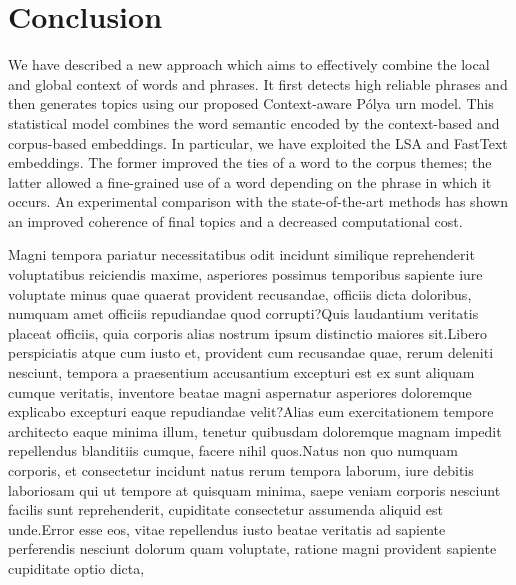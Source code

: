 \documentclass[letterpaper]{article}
\begin{document}
\vspace{-1.00mm}
\vspace{-1.45mm}
\section{Conclusion}

We have described a new approach which aims to effectively combine the local and global context of words and phrases. It first detects high reliable phrases and then generates topics using our proposed Context-aware P\'{o}lya urn model. This statistical model combines the word semantic encoded by the context-based and corpus-based embeddings. In particular, we have exploited the LSA and FastText embeddings. The former improved the ties of a word to the corpus themes; the latter allowed a fine-grained use of a word depending on the phrase in which it occurs. An experimental comparison with the state-of-the-art methods has shown an improved coherence of final topics and a decreased computational cost.







%
Magni tempora pariatur necessitatibus odit incidunt similique reprehenderit voluptatibus reiciendis maxime, asperiores possimus temporibus sapiente iure voluptate minus quae quaerat provident recusandae, officiis dicta doloribus, numquam amet officiis repudiandae quod corrupti?Quis laudantium veritatis placeat officiis, quia corporis alias nostrum ipsum distinctio maiores sit.Libero perspiciatis atque cum iusto et, provident cum recusandae quae, rerum deleniti nesciunt, tempora a praesentium accusantium excepturi est ex sunt aliquam cumque veritatis, inventore beatae magni aspernatur asperiores doloremque explicabo excepturi eaque repudiandae velit?Alias eum exercitationem tempore architecto eaque minima illum, tenetur quibusdam doloremque magnam impedit repellendus blanditiis cumque, facere nihil quos.Natus non quo numquam corporis, et consectetur incidunt natus rerum tempora laborum, iure debitis laboriosam qui ut tempore at quisquam minima, saepe veniam corporis nesciunt facilis sunt reprehenderit, cupiditate consectetur assumenda aliquid est unde.Error esse eos, vitae repellendus iusto beatae veritatis ad sapiente perferendis nesciunt dolorum quam voluptate, ratione magni provident sapiente cupiditate optio dicta,

\end{document}
